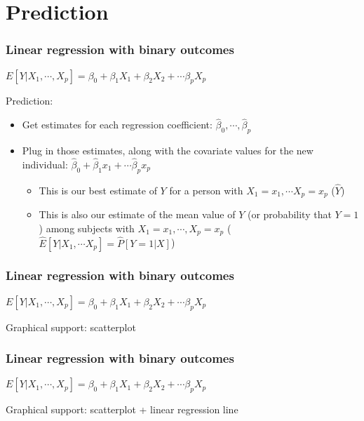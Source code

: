 \documentclass{beamer}
\begin{document}
\section{Prediction}
\begin{frame}
	\frametitle{Linear regression with binary outcomes}
	\begin{center} $E[Y|X_1,\cdots,X_p] = \beta_0 + \beta_1 X_1 + \beta_2 X_2 + \cdots \beta_p X_p$ \end{center}
	
	\color{blue} Prediction:\vspace{-0.3cm} \color{black}
	\begin{itemize} \itemsep +5pt
		\item Get estimates for each regression coefficient: $\hat\beta_0, \cdots, \hat\beta_p$ \pause
		\item Plug in those estimates, along with the covariate values for the new individual: $\hat\beta_0 + \hat\beta_1 x_1 + \cdots \hat\beta_p x_p$ \pause
		\begin{itemize} \itemsep +5pt
			\item This is our best estimate of $Y$ for a person with $X_1 = x_1, \cdots X_p = x_p$ ($\hat{Y}$) \pause
			\item This is also our estimate of the mean value of $Y$ (or probability that $Y=1$) among subjects with $X_1 = x_1, \cdots, X_p = x_p$ ($\hat{E}[Y|X_1,\cdots X_p] = \hat{P}[Y=1|X]$)
		\end{itemize}
	\end{itemize}
	
\end{frame}

\begin{frame}
	\frametitle{Linear regression with binary outcomes}
	\begin{center} $E[Y|X_1,\cdots,X_p] = \beta_0 + \beta_1 X_1 + \beta_2 X_2 + \cdots \beta_p X_p$ \end{center}
	
	\color{blue} Graphical support: \color{black} scatterplot
	\vspace{-0.55cm}
\end{frame}


\begin{frame}
	\frametitle{Linear regression with binary outcomes}
	\begin{center} $E[Y|X_1,\cdots,X_p] = \beta_0 + \beta_1 X_1 + \beta_2 X_2 + \cdots \beta_p X_p$ \end{center}
	
	\color{blue} Graphical support: \color{black} scatterplot + linear regression line
	\vspace{-0.55cm}
\end{frame}
\end{document}
